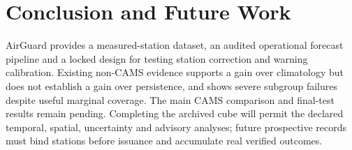 \section{Conclusion and Future Work}
AirGuard provides a measured-station dataset, an audited operational forecast
pipeline and a locked design for testing station correction and warning
calibration. Existing non-CAMS evidence supports a gain over climatology but
does not establish a gain over persistence, and shows severe subgroup failures
despite useful marginal coverage. The main CAMS comparison and final-test
results remain pending. Completing the archived cube will permit the declared
temporal, spatial, uncertainty and advisory analyses; future prospective records
must bind stations before issuance and accumulate real verified outcomes.
